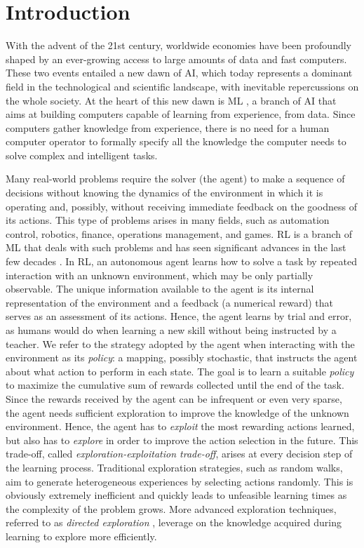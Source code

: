 
\chapter{Introduction}

With the advent of the 21st century, worldwide economies have been profoundly shaped by an ever-growing access to large amounts of data and fast computers. These two events entailed a new dawn of \gls{AI}, which today represents a dominant field in the technological and scientific landscape, with inevitable repercussions on the whole society. At the heart of this new dawn is \gls{ML} \cite{goodfellow2016deep}, a branch of \gls{AI} that aims at building computers capable of learning from experience, \ie from data. Since computers gather knowledge from experience, there is no need for a human computer operator to formally specify all the knowledge the computer needs to solve complex and intelligent tasks.

Many real-world problems require the solver (the agent) to make a sequence of decisions without knowing the dynamics of the environment in which it is operating and, possibly, without receiving immediate feedback on the goodness of its actions. This type of problems arises in many fields, such as automation control, robotics, finance, operations management, and games. \gls{RL} is a branch of \gls{ML} that deals with such problems and has seen significant advances in the last few decades \cite{sutton2018reinforcement}. In \gls{RL}, an autonomous agent learns how to solve a task by repeated interaction with an unknown environment, which may be only partially observable. The unique information available to the agent is its internal representation of the environment and a feedback (a numerical reward) that serves as an assessment of its actions. Hence, the agent learns by trial and error, as humans would do when learning a new skill without being instructed by a teacher. We refer to the strategy adopted by the agent when interacting with the environment as its \emph{policy}: a mapping, possibly stochastic, that instructs the agent about what action to perform in each state. The goal is to learn a suitable \emph{policy} to maximize the cumulative sum of rewards collected until the end of the task. Since the rewards received by the agent can be infrequent or even very sparse, the agent needs sufficient exploration to improve the knowledge of the unknown environment. Hence, the agent has to \emph{exploit} the most rewarding actions learned, but also has to \emph{explore} in order to improve the action selection in the future. This trade-off, called \emph{exploration-exploitation trade-off}, arises at every decision step of the learning process. Traditional exploration strategies, such as random walks, aim to generate heterogeneous experiences by selecting actions randomly. This is obviously extremely inefficient and quickly leads to unfeasible learning times as the complexity of the problem grows. More advanced exploration techniques, referred to as \emph{directed exploration} \cite{thrun1992efficient}, leverage on the knowledge acquired during learning to explore more efficiently.

